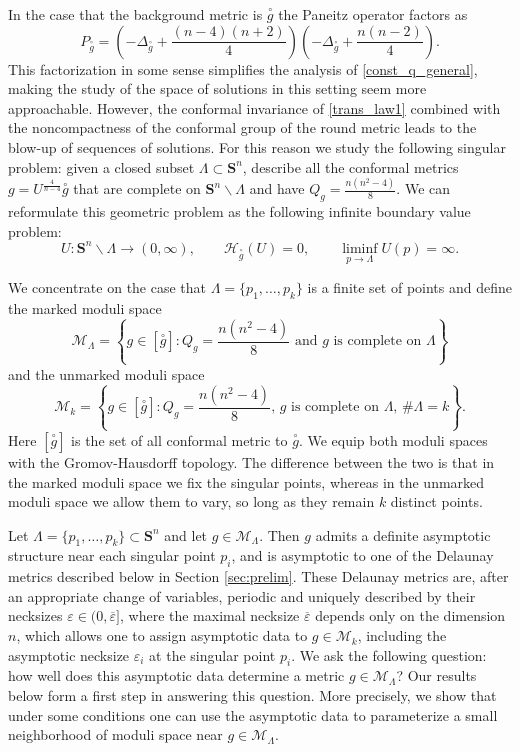 \documentclass[reqno,11pt]{amsart}
\theoremstyle{tttheorem}
\newcommand{\Ss}{\mathbf{S}}
\begin{document}
In the case that the background metric is $\overset{\circ}{g}$ the 
Paneitz operator factors as 
\begin{equation}\label{paneitz_op_sph}
P_{\overset{\circ}{g}} = \left ( -\Delta_{\overset{\circ}{g}} + \frac{(n-4)(n+2)}{4} 
\right ) \left ( -\Delta_{\overset{\circ}{g}} + \frac{n(n-2)}{4} \right ).
\end{equation} 
This factorization in some sense simplifies the analysis of \eqref{const_q_general}, 
making the study of the space of solutions in this setting seem 
more approachable. However, the conformal invariance of \eqref{trans_law1}
combined with the noncompactness of the conformal group of 
the round metric leads to the blow-up of sequences of solutions. 
For this reason we study the following singular problem: given a 
closed subset $\Lambda \subset \Ss^n$, describe 
all the conformal metrics $g = U^{\frac{4}{n-4}} \overset{\circ}{g}$ 
that are complete on $\Ss^n \backslash \Lambda$ and have 
$\displaystyle Q_g = \frac{n(n^2-4)}{8}$. We can reformulate 
this geometric problem as the following infinite boundary 
value problem: 
\begin{equation} \label{sing_yamabe_eqn} 
U: \Ss^n \backslash \Lambda \rightarrow (0,\infty), \qquad 
\mathcal{H}_{\overset{\circ}{g}} (U) = 0 , \qquad 
\liminf_{p\rightarrow \Lambda} U(p) = \infty. 
\end{equation} 

We concentrate on the case that $\Lambda = \{ p_1, \dots, p_k\}$ 
is a finite set of points and define the marked moduli space 
$$\mathcal{M}_\Lambda = \left \{ g \in [\overset{\circ}{g}] : Q_g = 
\frac{n(n^2-4)}{8} \mbox{ and } g \textrm{ is complete on }\Lambda \right \}$$
and the unmarked moduli space 
$$\mathcal{M}_k = \left \{ g \in [\overset{\circ}{g}] : Q_g 
= \frac{n(n^2-4)}{8}, \, g \textrm{ is complete on }\Lambda, \, \# \Lambda = k 
\right \} .$$
Here $[\overset{\circ}{g}]$ is the set of all conformal metric to $\overset{\circ}{g}$. We equip both moduli 
spaces with the Gromov-Hausdorff topology. The difference 
between the two is that in the marked moduli space we fix the singular 
points, whereas in the unmarked moduli space we allow them to vary, so long as 
they remain $k$ distinct points.  

Let $\Lambda = \{ p_1, \dots, p_k\} \subset \Ss^n$ and let $g\in 
\mathcal{M}_\Lambda$. Then $g$ admits a definite asymptotic 
structure near each singular point $p_i$, and is asymptotic to one 
of the Delaunay metrics described below in Section \ref{sec:prelim}. 
These Delaunay metrics are, after an appropriate change of variables, 
periodic and uniquely described by their necksizes $\varepsilon \in 
(0,\overline{\varepsilon}]$, where the maximal necksize $\overline{\varepsilon}$ 
depends only on the dimension $n$, which allows one to assign asymptotic 
data to $g \in \mathcal{M}_k$, including the asymptotic necksize 
$\varepsilon_i$ at the singular point $p_i$. We ask the following 
question: how well does this asymptotic data determine a metric 
$g \in \mathcal{M}_\Lambda$? Our results below form a 
first step in answering this question. More precisely, we show that 
under some conditions one can use the asymptotic data to parameterize a 
small neighborhood of moduli space near $g \in \mathcal{M}_\Lambda$. 
\end{document}

